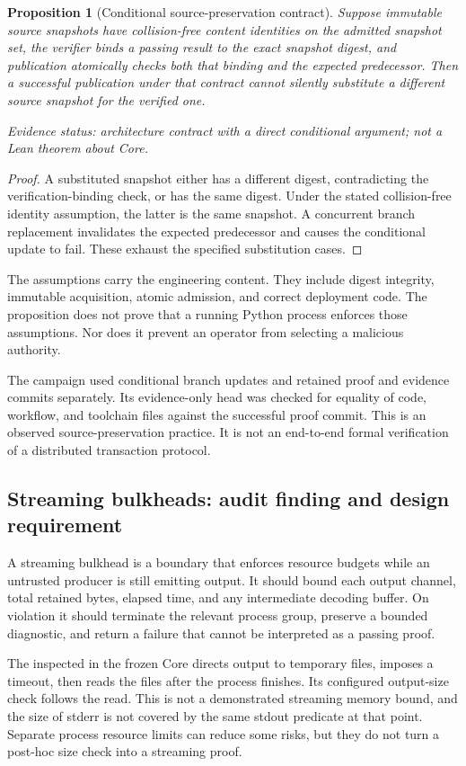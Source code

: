 \documentclass[11pt,reqno]{amsart}
\newtheorem{proposition}[theorem]{Proposition}
\theoremstyle{definition}
\newcommand{\code}[1]{\texttt{\small\detokenize{#1}}}
\newcommand{\status}[1]{\par\smallskip\noindent\textit{Evidence status: #1.}\par\smallskip}
\begin{document}
\begin{proposition}[Conditional source-preservation contract]\label{prop:transaction}
Suppose immutable source snapshots have collision-free content identities
on the admitted snapshot set, the verifier binds
a passing result to the exact snapshot digest, and publication atomically
checks both that binding and the expected predecessor. Then a successful
publication under that contract cannot silently substitute a different
source snapshot for the verified one.
\status{architecture contract with a direct conditional argument; not a Lean theorem about Core}
\end{proposition}
\begin{proof}
A substituted snapshot either has a different digest, contradicting the
verification-binding check, or has the same digest. Under the stated
collision-free identity assumption, the latter is the same snapshot. A concurrent
branch replacement invalidates the expected predecessor and causes the
conditional update to fail. These exhaust the specified substitution cases.
\end{proof}
The assumptions carry the engineering content. They include digest integrity,
immutable acquisition, atomic admission, and correct deployment code.
The proposition does not prove that a running Python process enforces those
assumptions. Nor does it prevent an operator from selecting a malicious
authority.

The campaign used conditional branch updates and retained proof and evidence
commits separately. Its evidence-only head was checked for equality of code,
workflow, and toolchain files against the successful proof commit.
This is an observed source-preservation practice. It is not an end-to-end
formal verification of a distributed transaction protocol.

\subsection{Streaming bulkheads: audit finding and design requirement}
A streaming bulkhead is a boundary that enforces resource budgets while an
untrusted producer is still emitting output. It should bound each output
channel, total retained bytes, elapsed time, and any intermediate decoding
buffer. On violation it should terminate the relevant process group, preserve
a bounded diagnostic, and return a failure that cannot be interpreted as a
passing proof.

The inspected \code{SubprocessVerifier} in the frozen Core directs output to
temporary files, imposes a timeout, then reads the files after the process
finishes. Its configured output-size check follows the read. This is not
a demonstrated streaming memory bound, and the size of stderr is not covered
by the same stdout predicate at that point. Separate process resource limits
can reduce some risks, but they do not turn a post-hoc size check into a
streaming proof.
\end{document}
